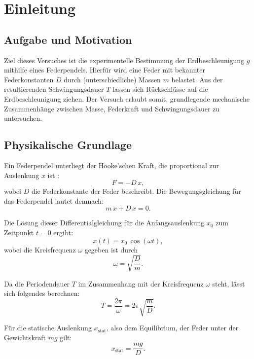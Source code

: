 \chapter{Einleitung}

\section{Aufgabe und Motivation}
Ziel dieses Versuches ist die experimentelle Bestimmung der Erdbeschleunigung $g$ mithilfe eines Federpendels. Hierfür wird eine Feder mit bekannter Federkonstanten $D$ durch (unterschiedliche) Massen $m$ belastet. Aus der resultierenden Schwingungsdauer $T$ lassen sich Rückschlüsse auf die Erdbeschleunigung ziehen. Der Versuch erlaubt somit, grundlegende mechanische Zusammenhänge zwischen Masse, Federkraft und Schwingungsdauer zu untersuchen.

\section{Physikalische Grundlage}
Ein Federpendel unterliegt der Hooke'schen Kraft, die proportional zur Auslenkung $x$ ist \cite{skript25,demtroeder17}:
\begin{equation}
    F = -D \, x,
\end{equation}
wobei $D$ die Federkonstante der Feder beschreibt. Die Bewegungsgleichung für das Federpendel lautet demnach:
\begin{equation}
    m \, \ddot{x} + D \, x = 0.
\end{equation}

Die Lösung dieser Differentialgleichung für die Anfangsauslenkung $x_0$ zum Zeitpunkt $t = 0$ ergibt:
\begin{equation}
    x(t) = x_0 \, \cos(\omega t),
\end{equation}
wobei die Kreisfrequenz $\omega$ gegeben ist durch
\begin{equation}
    \omega = \sqrt{\frac{D}{m}}.
\end{equation}

Da die Periodendauer $T$ im Zusammenhang mit der Kreisfrequenz $\omega$ steht, lässt sich folgendes berechnen:
\begin{equation}
    T = \frac{2 \pi}{\omega} = 2 \pi \sqrt{\frac{m}{D}}.
\end{equation}

Für die statische Auslenkung $x_\text{stat}$, also dem Equilibrium, der Feder unter der Gewichtskraft $mg$ gilt:
\begin{equation}
    x_\text{stat} = \frac{mg}{D}.
\end{equation}

